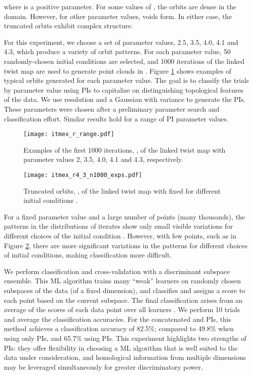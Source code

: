 \documentclass[11pt]{article}
\begin{document}
where  is a positive parameter.  For some values of , the orbits  are dense in the domain.  However, for other parameter values, voids form.  In either case, the truncated orbits   exhibit complex structure. 

For this experiment, we choose a set of parameter values,  2.5, 3.5, 4.0, 4.1 and 4.3, which produce a variety of orbit patterns. For each parameter value, 50 randomly-chosen initial conditions are selected, and 1000 iterations of the linked twist map are used to generate point clouds in .  Figure \ref{fig:LTM} shows examples of typical orbits generated for each parameter value.  The goal is to classify the trials by parameter value using PIs to capitalize on distinguishing topological features of the data. We use resolution  and a Gaussian with variance  to generate the PIs. These parameters were chosen after a preliminary parameter search and classification effort. Similar results hold for a range of PI parameter values. 

\begin{figure} [h]
\captionsetup[subfigure]{justification=centering}
\centering
\texttt{[image: itmex\_r\_range.pdf]}
\caption{Examples of the first 1000 iterations, ,  of the linked twist map with parameter values  2, 3.5, 4.0, 4.1 and 4.3, respectively.}
\label{fig:LTM}
\end{figure}

\begin{figure}[h!]
\centering
\texttt{[image: itmex\_r4\_3\_n1000\_exps.pdf]}
\caption{Truncated orbits, , of the linked twist map with fixed  for different initial conditions .}
\label{fig:LTM4-3var}
\end{figure}
For a fixed  parameter value and a large number of points (many thousands), the patterns in the distributions of iterates show only small visible variations for different choices of the initial condition . However, with few points, such as in Figure \ref{fig:LTM4-3var}, there are more significant variations in the patterns for different choices of initial conditions, making classification more difficult. 



We perform classification and cross-validation with a discriminant subspace ensemble.  This ML algorithm trains many ``weak'' learners on randomly chosen subspaces of the data (of a fixed dimension), and classifies and  assigns a score to each point based on the current subspace. The final classification arises from an average of the scores of each data point over all learners \citep{ho1998random}. We perform 10 trials and average the classification accuracies.  For the concatenated  and  PIs, this method achieves a classification accuracy of 82.5\%; compared to 49.8\% when using only  PIs, and 65.7\% using  PIs.  This experiment highlights two strengths of PIs: they offer flexibility in choosing a ML algorithm that is well suited to the data under consideration, and homological information from multiple dimensions may be leveraged simultaneously for greater discriminatory power.
 
\end{document}
